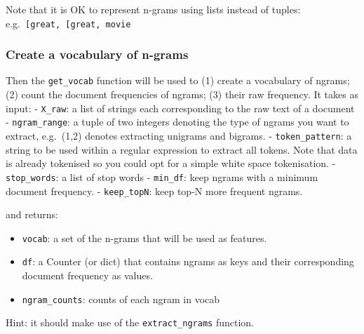 \documentclass[11pt]{article}
\providecommand{\tightlist}{%
      \setlength{\itemsep}{0pt}\setlength{\parskip}{0pt}}
\begin{document}
    Note that it is OK to represent n-grams using lists instead of tuples:
e.g.~\texttt{{[}\textquotesingle{}great\textquotesingle{},\ {[}\textquotesingle{}great\textquotesingle{},\ \textquotesingle{}movie\textquotesingle{}{]}{]}}

    \hypertarget{create-a-vocabulary-of-n-grams}{%
\subsubsection{Create a vocabulary of
n-grams}\label{create-a-vocabulary-of-n-grams}}

Then the \texttt{get\_vocab} function will be used to (1) create a
vocabulary of ngrams; (2) count the document frequencies of ngrams; (3)
their raw frequency. It takes as input: - \texttt{X\_raw}: a list of
strings each corresponding to the raw text of a document -
\texttt{ngram\_range}: a tuple of two integers denoting the type of
ngrams you want to extract, e.g.~(1,2) denotes extracting unigrams and
bigrams. - \texttt{token\_pattern}: a string to be used within a regular
expression to extract all tokens. Note that data is already tokenised so
you could opt for a simple white space tokenisation. -
\texttt{stop\_words}: a list of stop words - \texttt{min\_df}: keep
ngrams with a minimum document frequency. - \texttt{keep\_topN}: keep
top-N more frequent ngrams.

and returns:

\begin{itemize}
\tightlist
\item
  \texttt{vocab}: a set of the n-grams that will be used as features.
\item
  \texttt{df}: a Counter (or dict) that contains ngrams as keys and
  their corresponding document frequency as values.
\item
  \texttt{ngram\_counts}: counts of each ngram in vocab
\end{itemize}

Hint: it should make use of the \texttt{extract\_ngrams} function.
\end{document}
